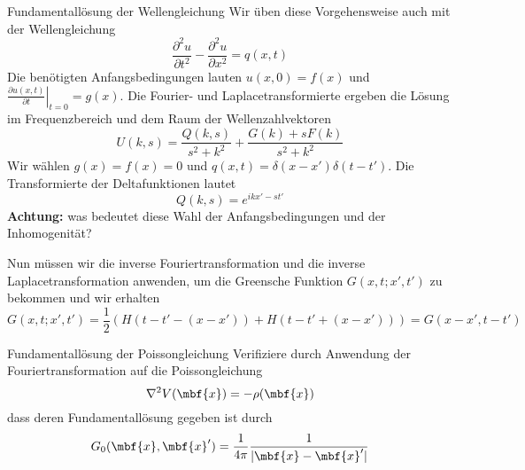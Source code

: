 \begin{example}{Fundamentallösung der Wellengleichung}
Wir üben diese Vorgehensweise auch mit der Wellengleichung
\begin{equation}
	\frac{\partial^2 u}{\partial t^2}-\frac{\partial^2 u}{\partial x^2}=q(x,t)
	\label{eqnwave}
\end{equation}
Die benötigten Anfangsbedingungen lauten $u(x,0)=f(x)$ und $\left.\frac{\partial
u(x,t)}{\partial t}\right|_{t=0}=g(x)$. Die Fourier- und Laplacetransformierte
ergeben die Lösung im Frequenzbereich und dem Raum der Wellenzahlvektoren 
\begin{equation}
	U(k,s)=\frac{Q(k,s)}{s^2+k^2}+\frac{G(k)+sF(k)}{s^2+k^2}
	\label{eqnuofkands}
\end{equation}
Wir wählen $g(x)=f(x)=0$ und $q(x,t)=\delta(x-x')\delta(t-t')$. Die
Transformierte der Deltafunktionen lautet
\[ Q(k,s)=e^{ikx'-st'}\]
{\bf Achtung:} was bedeutet diese Wahl der Anfangsbedingungen und der Inhomogenität?

Nun müssen wir die inverse Fouriertransformation und die inverse Laplacetransformation anwenden, um die 
Greensche Funktion $G(x,t;x',t')$ zu bekommen und wir erhalten
\begin{equation}
	G(x,t;x',t')=\frac{1}{2}\left(H\left(t-t'-(x-x')\right)+H\left(t-t'+(x-x')\right)\right)=G(x-x',t-t')
	\label{eq:GFwave}
\end{equation}
\end{example}

\begin{example}{Fundamentallösung der Poissongleichung}
Verifiziere durch Anwendung der Fouriertransformation auf die Poissongleichung
\begin{equation}
	\nabla^2 V(\mbf{x})=-\rho(\mbf{x})
	\label{eq:Poisson}
\end{equation}
dass deren Fundamentallösung gegeben ist durch 
\begin{equation}
  G_0(\mbf{x},\mbf{x}')=\frac{1}{4\pi}\frac{1}{|\mbf{x}-\mbf{x}'|}
	\label{eq:FSPoisson}
\end{equation}
\end{example}
